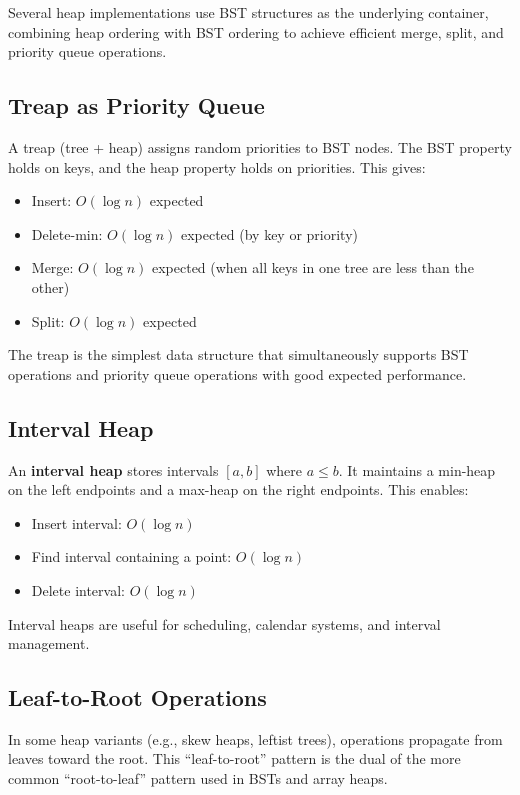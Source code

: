 Several heap implementations use BST structures as the underlying container, combining heap ordering with BST ordering to achieve efficient merge, split, and priority queue operations.

\subsection{Treap as Priority Queue}

A treap (tree + heap) assigns random priorities to BST nodes. The BST property holds on keys, and the heap property holds on priorities. This gives:
\begin{itemize}
    \item Insert: $O(\log n)$ expected
    \item Delete-min: $O(\log n)$ expected (by key or priority)
    \item Merge: $O(\log n)$ expected (when all keys in one tree are less than the other)
    \item Split: $O(\log n)$ expected
\end{itemize}

The treap is the simplest data structure that simultaneously supports BST operations and priority queue operations with good expected performance.

\subsection{Interval Heap}

An \textbf{interval heap} stores intervals $[a, b]$ where $a \leq b$. It maintains a min-heap on the left endpoints and a max-heap on the right endpoints. This enables:
\begin{itemize}
    \item Insert interval: $O(\log n)$
    \item Find interval containing a point: $O(\log n)$
    \item Delete interval: $O(\log n)$
\end{itemize}

Interval heaps are useful for scheduling, calendar systems, and interval management.

\subsection{Leaf-to-Root Operations}

In some heap variants (e.g., skew heaps, leftist trees), operations propagate from leaves toward the root. This ``leaf-to-root'' pattern is the dual of the more common ``root-to-leaf'' pattern used in BSTs and array heaps.

